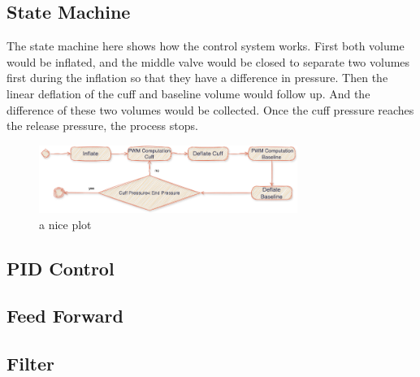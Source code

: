 \subsection{State Machine}
The state machine here shows how the control system works. First both volume would be inflated, and the middle valve would be closed to separate two volumes first during the inflation so that they have a difference in pressure. Then the linear deflation of the cuff and baseline volume would follow up. And the difference of these two volumes would be collected. Once the cuff pressure reaches the release pressure, the process stops. 

\begin{figure}[h]
    \centering 
    \captionsetup{justification=centering}
    \includegraphics[width=0.75\textwidth]{img/st_diff.png}
    \caption{a nice plot}
    \label{fig:mesh1}
\end{figure}


\subsection{PID Control}
\subsection{Feed Forward}
\subsection{Filter}